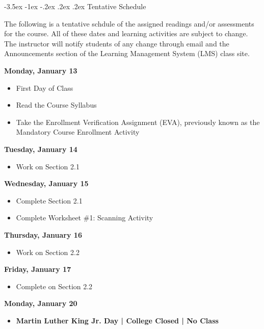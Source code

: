 \documentclass[11pt]{article}
\makeatletter
\renewcommand\section{\@startsection{section}{1}{0pt}%
  {-3.5ex \@plus -1ex \@minus -.2ex}%
  {.2ex \@plus.2ex}%
  {\normalfont\Large\bfseries}} %
\makeatother
\begin{document}
\pagebreak
\section{Tentative Schedule}

The following is a tentative schdule of the assigned readings and/or assessments for the course. All of these dates and learning activities are subject to change. The instructor will notify students of any change through email and the Announcements section of the Learning Management System (LMS) class site.

\textbf{Monday, January 13}

\begin{itemize}
\item First Day of Class
\item Read the Course Syllabus
\item Take the Enrollment Verification Assignment (EVA), previously known as the Mandatory Course Enrollment Activity
\end{itemize}

\textbf{Tuesday, January 14}

\begin{itemize}
\item Work on Section 2.1
\end{itemize}

\textbf{Wednesday, January 15}

\begin{itemize}
\item Complete Section 2.1
\item Complete Worksheet \#1: Scanning Activity
\end{itemize}

\textbf{Thursday, January 16}

\begin{itemize}
\item Work on Section 2.2
\end{itemize}

\textbf{Friday, January 17}

\begin{itemize}
\item Complete on Section 2.2
\end{itemize}

\textbf{Monday, January 20}

\begin{itemize}
\item \textbf{Martin Luther King Jr. Day | College Closed | No Class}
\end{itemize}
\end{document}
